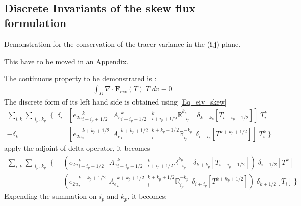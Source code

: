 $\ $\newpage      %
\subsection{Discrete Invariants of the skew flux formulation}
\label{Apdx_eiv_skew}


Demonstration for the conservation of the tracer variance in the (\textbf{i},\textbf{j}) plane. 

This have to be moved in an Appendix.

The continuous property to be demonstrated is :
\begin{align*}
\int_D \nabla \cdot \textbf{F}_{eiv}(T) \; T \;dv  \equiv 0
\end{align*}
The discrete form of its left hand side is obtained using \eqref{Eq_eiv_skew}
\begin{align*}
 \sum\limits_{i,k} \sum_{\substack{i_p,\,k_p}}  \Biggl\{   \;\;
 \delta_i  &\left[                                                    
{e_{2u}}_{i+i_p+1/2}^{k}                                  \;\ \ {A_{e}}_{i+i_p+1/2}^{k} 
\ \ \ { _{i+i_p+1/2}^k \mathbb{R}_{-i_p}^{k_p} }   \quad \delta_{k+k_p}[T_{i+i_p+1/2}]         
   \right] \; T_i^k      \\
- \delta_k &\left[ 
{e_{2u}}_i^{k+k_p+1/2}                                     \ \ {A_{e}}_i^{k+k_p+1/2} 
\ \ { _i^{k+k_p+1/2} \mathbb{R}_{i_p}^{-k_p} }   \ \ \delta_{i+i_p}[T^{k+k_p+1/2}]   
   \right] \; T_i^k      \         \Biggr\}   
\end{align*}
apply the adjoint of delta operator, it becomes
\begin{align*}
 \sum\limits_{i,k} \sum_{\substack{i_p,\,k_p}}  \Biggl\{   \;\;
  &\left(                                                    
{e_{2u}}_{i+i_p+1/2}^{k}                                  \;\ \ {A_{e}}_{i+i_p+1/2}^{k} 
\ \ \ { _{i+i_p+1/2}^k \mathbb{R}_{-i_p}^{k_p} }   \quad \delta_{k+k_p}[T_{i+i_p+1/2}]         
   \right) \; \delta_{i+1/2}[T^{k}]      \\
- &\left( 
{e_{2u}}_i^{k+k_p+1/2}                                     \ \ {A_{e}}_i^{k+k_p+1/2} 
\ \ { _i^{k+k_p+1/2} \mathbb{R}_{i_p}^{-k_p} }   \ \ \delta_{i+i_p}[T^{k+k_p+1/2}]   
     \right) \; \delta_{k+1/2}[T_{i}]       \         \Biggr\}       
\end{align*}
Expending the summation on $i_p$ and $k_p$, it becomes:
